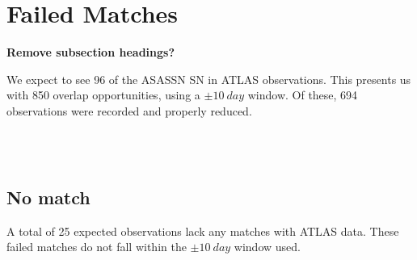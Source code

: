 \section{Failed Matches}

{\bf Remove subsection headings?}

We expect to see 96 of the ASASSN SN in ATLAS observations. 
This presents us with 850 overlap opportunities, using a 
$\pm10~day$ window. Of these, 694 observations were recorded 
and properly reduced. %

\\%
\\


\subsection{No match}\label{sec:nomatch}
A total of 25 expected observations lack any matches with ATLAS data. These failed 
matches do not fall within the $\pm10~day$ window used.


